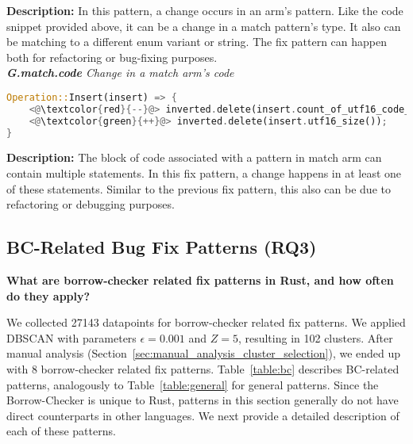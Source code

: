 \noindent\textbf{Description:} In this pattern, a change occurs in an arm's pattern. Like the code snippet provided above, it can be a change in a match pattern's type. It also can be matching to a different enum variant or string. The fix pattern can happen both for refactoring or bug-fixing purposes. \\

\noindent\textit{\textbf{G.match.code} Change in a match arm's code}

\begin{lstlisting}[language=Rust, style=colouredRust]
Operation::Insert(insert) => {
    <@\textcolor{red}{--}@> inverted.delete(insert.count_of_utf16_code_units());
    <@\textcolor{green}{++}@> inverted.delete(insert.utf16_size());
}
\end{lstlisting}

\noindent\textbf{Description:} The block of code associated with a pattern in match arm can contain multiple statements. In this fix pattern, a change happens in at least one of these statements. Similar to the previous fix pattern, this also can be due to refactoring or debugging purposes.

\subsection{\label{sec:bc_patterns}BC-Related Bug Fix Patterns (RQ3)}

\textbf{What are borrow-checker related fix patterns in Rust, and how often do they apply?} 

We collected 27143 datapoints for borrow-checker related fix patterns. We applied DBSCAN with parameters $\epsilon=0.001$ and $Z=5$, resulting in 102 clusters. After manual analysis (Section~\ref{sec:manual_analysis_cluster_selection}), we ended up with 8 borrow-checker related fix patterns. Table~\ref{table:bc} describes BC-related patterns, analogously to Table~\ref{table:general} for general patterns. Since the Borrow-Checker is unique to Rust, patterns in this section generally do not have direct counterparts in other languages. We next provide a detailed description of each of these patterns.

